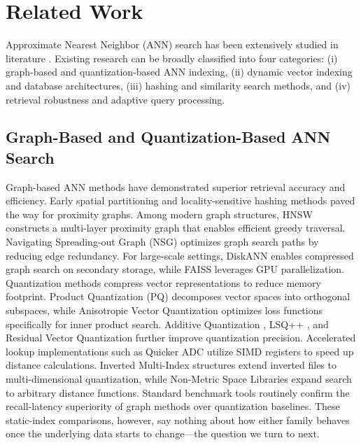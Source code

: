 \documentclass{ieeeaccess}
\begin{document}
\section{Related Work}
\label{sec:related}
Approximate Nearest Neighbor (ANN) search has been extensively studied in literature \cite{Xiao2024, VectorSurvey2024}. Existing research can be broadly classified into four categories: (i) graph-based and quantization-based ANN indexing, (ii) dynamic vector indexing and database architectures, (iii) hashing and similarity search methods, and (iv) retrieval robustness and adaptive query processing.
\subsection{Graph-Based and Quantization-Based ANN Search}
Graph-based ANN methods have demonstrated superior retrieval accuracy and efficiency. Early spatial partitioning and locality-sensitive hashing methods \cite{Bentley1975, Friedman1977, Indyk1998} paved the way for proximity graphs. Among modern graph structures, HNSW \cite{Malkov2020} constructs a multi-layer proximity graph that enables efficient greedy traversal. Navigating Spreading-out Graph (NSG) \cite{NSG2019, Fu2023} optimizes graph search paths by reducing edge redundancy. For large-scale settings, DiskANN \cite{DiskANN2020, MicrosoftDiskANN} enables compressed graph search on secondary storage, while FAISS \cite{FAISS2019} leverages GPU parallelization.
Quantization methods compress vector representations to reduce memory footprint. Product Quantization (PQ) \cite{PQ2011, Matsui2018} decomposes vector spaces into orthogonal subspaces, while Anisotropic Vector Quantization \cite{ScaNN2020, Guo2020_45} optimizes loss functions specifically for inner product search. Additive Quantization \cite{Martinez2016}, LSQ++ \cite{Martinez2018}, and Residual Vector Quantization \cite{Liu2015} further improve quantization precision. Accelerated lookup implementations such as Quicker ADC \cite{Andre2019} utilize SIMD registers to speed up distance calculations. Inverted Multi-Index structures \cite{Babenko2015} extend inverted files to multi-dimensional quantization, while Non-Metric Space Libraries \cite{Boytsov2013} expand search to arbitrary distance functions. Standard benchmark tools \cite{ANNBenchmarks2020, ANNBenchmarks2022, Aumuller2020_46, Simhadri2023, Simhadri2024} routinely confirm the recall-latency superiority of graph methods over quantization baselines. These static-index comparisons, however, say nothing about how either family behaves once the underlying data starts to change---the question we turn to next.
\end{document}
